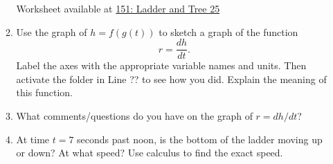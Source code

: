 \documentclass{ximera}
\begin{document}
\begin{question}
\begin{enumerate}
\begin{enumerate}
Worksheet available at \href{https://www.desmos.com/calculator/duq8yqxozk}{151: Ladder and Tree 25} 


\item Use the graph of $h=f(g(t))$ to sketch a graph of the function
\[
  r = \frac{dh}{dt} .
\]
Label the axes with the appropriate variable names and units. Then activate the folder in Line ?? to see how you did. Explain the meaning of this function.

\item What comments/questions do you have on the graph of $r=dh/dt$?

\item At time $t=7$ seconds past noon, is the bottom of the ladder moving up or down? At what speed? Use calculus to find the exact speed.


\end{enumerate}


\end{enumerate}

\end{question}
\end{document}
